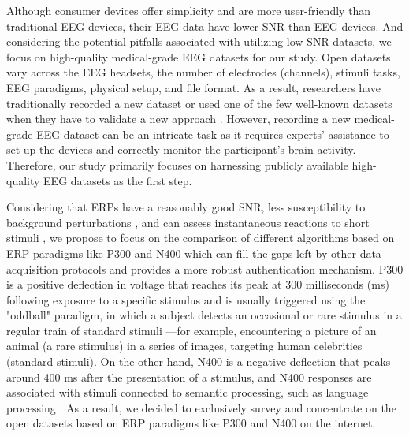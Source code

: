 Although consumer devices offer simplicity and are more user-friendly than traditional EEG devices, their EEG data have lower SNR than EEG devices. And considering the potential pitfalls associated with utilizing low SNR datasets, we focus on high-quality medical-grade EEG datasets for our study. Open datasets vary across the EEG headsets, the number of electrodes (channels), stimuli tasks, EEG paradigms, physical setup, and file format. As a result, researchers have traditionally recorded a new dataset or used one of the few well-known datasets when they have to validate a new approach \cite{moabb}. However, recording a new medical-grade EEG dataset can be an intricate task as it requires experts' assistance to set up the devices and correctly monitor the participant's brain activity. Therefore, our study primarily focuses on harnessing publicly available high-quality EEG datasets as the first step.
\smallskip

Considering that ERPs have a reasonably good SNR, less susceptibility to background perturbations \cite{armstrong2015brainprint}, and can assess instantaneous reactions to short stimuli \cite{zhang2021review}, we propose to focus on the comparison of different algorithms based on ERP paradigms like P300 and N400 which can fill the gaps left by other data acquisition protocols and provides a more robust authentication mechanism. P300 is a positive deflection in voltage that reaches its peak at 300 milliseconds (ms) following exposure to a specific stimulus and is usually triggered using the "oddball" paradigm, in which a subject detects an occasional or rare stimulus in a regular train of standard stimuli \cite{picton1992p300}—for example, encountering a picture of an animal (a rare stimulus) in a series of images, targeting human celebrities (standard stimuli). On the other hand, N400 is a negative deflection that peaks around 400 ms after the presentation of a stimulus, and N400 responses are associated with stimuli connected to semantic processing, such as language processing \cite{arias2021inexpensive}. As a result, we decided to exclusively survey and concentrate on the open datasets based on ERP paradigms like P300 and N400 on the internet.  
\smallskip

